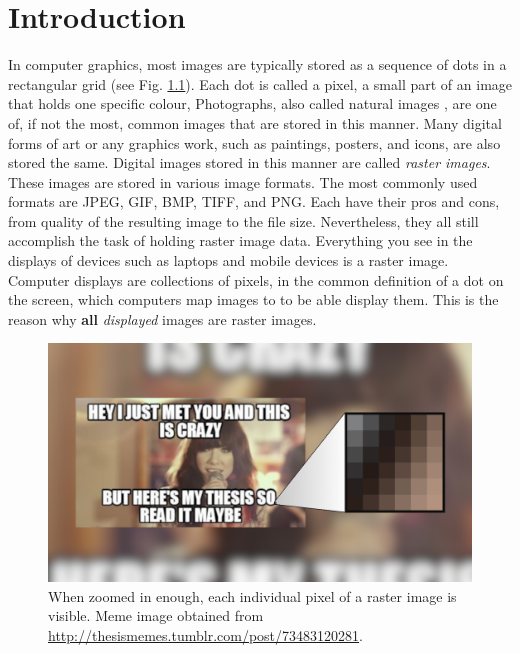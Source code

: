 \chapter{Introduction} \label{sec:intro}

In computer graphics, most images are typically stored as a sequence of dots in a rectangular grid (see Fig. \ref{fig:raster-images-upclose}). Each dot is called a pixel, a small part of an image that holds one specific colour, Photographs, also called natural images \cite{hoshyari2018perceptiondriven}, are one of, if not the most, common images that are stored in this manner. Many digital forms of art or any graphics work, such as paintings, posters, and icons, are also stored the same. Digital images stored in this manner are called \textit{raster images}. These images are stored in various image formats. The most commonly used formats are JPEG, GIF, BMP, TIFF, and PNG. Each have their pros and cons, from quality of the resulting image to the file size. Nevertheless, they all still accomplish the task of holding raster image data. Everything you see in the displays of devices such as laptops and mobile devices is a raster image. Computer displays are collections of pixels, in the common definition of a dot on the screen, which computers map images to to be able display them. This is the reason why \textbf{all} \textit{displayed} images are raster images.

\begin{figure}[h]
	\centering
	\includegraphics[scale=1.0]{images/chap01-introduction/raster-images-upclose.png}
	\caption{When zoomed in enough, each individual pixel of a raster image is visible. Meme image obtained from \protect\url{http://thesismemes.tumblr.com/post/73483120281}.}
	\label{fig:raster-images-upclose}
\end{figure}

